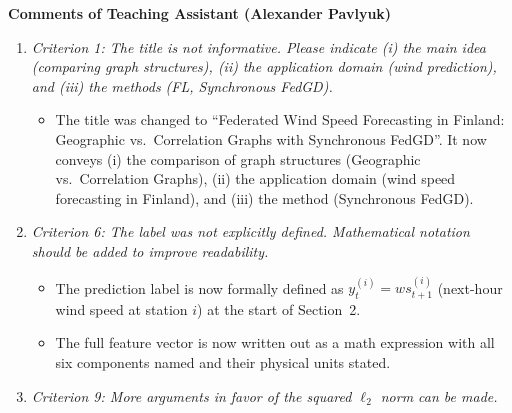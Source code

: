 \documentclass[11pt,onecolumn]{IEEEtran}
\begin{document}
\begin{center}
      {\bf\large Comments of Teaching Assistant (Alexander Pavlyuk)}
      \vspace{1mm}
\end{center}

\begin{enumerate}

      \item[TA.1] {\em Criterion 1: The title is not informative. Please indicate (i) the main idea (comparing
            graph structures), (ii) the application domain (wind prediction), and (iii) the methods
            (FL, Synchronous FedGD).}

            \vspace*{2mm}
            \begin{itemize}
                  \item The title was changed to ``Federated Wind Speed Forecasting in Finland:
                        Geographic vs.\ Correlation Graphs with Synchronous FedGD''.
                        It now conveys (i) the comparison of graph structures (Geographic vs.\ Correlation Graphs),
                        (ii) the application domain (wind speed forecasting in Finland), and
                        (iii) the method (Synchronous FedGD).
            \end{itemize}
            \vspace*{4mm}

      \item[TA.2] {\em Criterion 6: The label was not explicitly defined. Mathematical notation should be added
            to improve readability.}

            \vspace*{2mm}
            \begin{itemize}
                  \item The prediction label is now formally defined as $y^{(i)}_t = ws^{(i)}_{t+1}$
                        (next-hour wind speed at station $i$) at the start of Section~2.
                  \item The full feature vector is now written out as a math expression with all six
                        components named and their physical units stated.
            \end{itemize}
            \vspace*{4mm}

      \item[TA.3] {\em Criterion 9: More arguments in favor of the squared $\ell_2$ norm can be made.}


\end{enumerate}
\end{document}
